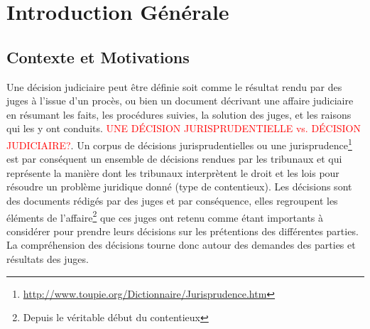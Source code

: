 %
\chapter*{Introduction Générale}
\label{chap:intro}

\section{Contexte et Motivations}
\label{sec:intro:contexte}
Une décision judiciaire peut être définie soit comme  le résultat rendu par des juges à l'issue d'un procès, ou bien un document décrivant une affaire judiciaire en résumant les faits, les procédures suivies, la solution des juges, et les raisons qui les y ont conduits. \textcolor{red}{UNE DÉCISION JURISPRUDENTIELLE vs. DÉCISION JUDICIAIRE?}. Un corpus de décisions jurisprudentielles ou une jurisprudence\footnote{\url{http://www.toupie.org/Dictionnaire/Jurisprudence.htm}} est par conséquent un ensemble de décisions rendues par les tribunaux et qui représente la manière dont les tribunaux interprètent le droit et les lois pour résoudre un problème juridique donné (type de contentieux). Les décisions sont des documents rédigés par des juges et par conséquence, elles regroupent les éléments de l'affaire\footnote{Depuis le véritable début du contentieux} que ces juges ont retenu comme étant importants à considérer pour prendre leurs décisions sur les prétentions des différentes parties. La compréhension des décisions tourne donc autour des demandes des parties et résultats des juges.

